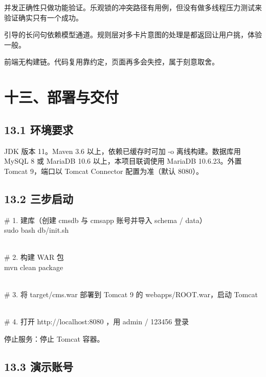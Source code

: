 \documentclass[zihao=-4,UTF8,openany]{ctexart}
\renewcommand{\_}{\textunderscore\allowbreak}
\begin{document}
并发正确性只做功能验证。乐观锁的冲突路径有用例，但没有做多线程压力测试来验证确实只有一个成功。

引导的长问句依赖模型通道。规则层对多卡片意图的处理是都返回让用户挑，体验一般。

前端无构建链。代码复用靠约定，页面再多会失控，属于刻意取舍。

\section*{\texorpdfstring{\textbf{十三、部署与交付}}{十三、部署与交付}}\label{ux5341ux4e8cux90e8ux7f72ux4e0eux4ea4ux4ed8}

\subsection*{\texorpdfstring{\textbf{13.1 环境要求}}{13.1 环境要求}}\label{ux73afux5883ux8981ux6c42}

JDK 版本 11。Maven 3.6 以上，依赖已缓存时可加 -o 离线构建。数据库用 MySQL 8 或 MariaDB 10.6 以上，本项目联调使用 MariaDB 10.6.23。外置 Tomcat 9，端口以 Tomcat Connector 配置为准（默认 8080）。

\subsection*{\texorpdfstring{\textbf{13.2 三步启动}}{13.2 三步启动}}\label{ux4e09ux6b65ux542fux52a8}

\# 1. 建库（创建 cms\_db 与 cmsapp 账号并导入 schema / data）\\
sudo bash db/init.sh\\
\strut \\
\# 2. 构建 WAR 包\\
mvn clean package\\
\strut \\
\# 3. 将 target/cms.war 部署到 Tomcat 9 的 webapps/ROOT.war，启动 Tomcat\\
\strut \\
\# 4. 打开 http://localhost:8080 ，用 admin / 123456 登录

停止服务：停止 Tomcat 容器。

\subsection*{\texorpdfstring{\textbf{13.3 演示账号}}{13.3 演示账号}}\label{ux6f14ux793aux8d26ux53f7}
\end{document}
